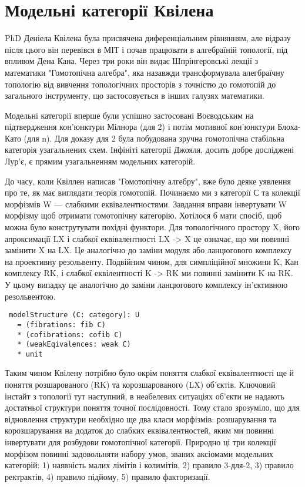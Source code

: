 \section{Модельні категорії Квілена}

PhD Деніела Квілена була присвячена диференціальним рівнянням,
але відразу після цього він перевівся в МІТ і почав працювати
в алгебраїній топології, під впливом Дена Кана. Через три роки
він видає Шпрінгеровські лекції з математики "Гомотопічна алгебра",
яка назавжди трансформувала алегбраїчну топологію від вивчення
топологічних просторів з точністю до гомотопій до загального
інструменту, що застосовується в інших галузях математики.

Модельні категорії вперше були успішно застосовані Воєводським
на підтвердження кон'юнктури Мілнора (для 2) і потім мотивної
кон'юнктури Блоха-Като (для n). Для доказу для 2 була побудована
зручна гомотопічна стабільна категорія узагальнених схем. Інфініті
категорії Джояля, досить добре досліджені Лур'є, є прямим
узагальненням модельних категорій.

До часу, коли Квіллен написав "Гомотопічну алгебру", вже було
деяке уявлення про те, як має виглядати теорія гомотопій.
Починаємо ми з категорії С та колекції морфізмів W --- слабкими
еквівалентностями. Завдання вправи інвертувати W морфізму щоб
отримати гомотопічну категорію. Хотілося б мати спосіб, щоб
можна було конструтувати похідні функтори. Для топологічного
простору X, його апроксимації LX і слабкої еквівалентності LX -> X це
означає, що ми повинні замінити X на LX. Це аналогічно до заміни
модуля або ланцюгового комплексу на проективну резольвенту.
Подвійним чином, для симпліційної множини K, Кан комплексу
RK, і слабкої еквілентності K -> RK ми повинні замінити K
на RK. У цьому випадку це аналогічно до заміни ланцюгового
комплексу ін'єктивною резольвентою.

\begin{lstlisting}
 modelStructure (C: category): U
   = (fibrations: fib C)
   * (cofibrations: cofib C)
   * (weakEqivalences: weak C)
   * unit
\end{lstlisting}

Таким чином Квілену потрібно було окрім поняття слабкої еквівалентності
ще й поняття розшарованого (RK) та корозшарованого (LX) об'єктів.
Ключовий інстайт з топології тут наступний, в неабелевих ситуаціях
об'єкти не надають достатньої структури поняття точної послідовності.
Тому стало зрозуміло, що для відновлення структури необхідно ще два
класи морфізмів: розшарування та корозшарування на додаток до слабких
еквівалентностей, яким ми повинні інвертувати для розбудови гомотопічної
категорії. Природно ці три колекції морфізом повинні задовольняти
набору умов, званих аксіомами модельних категорій: 1) наявність
малих лімітів і колимітів, 2) правило 3-для-2, 3) правило ректрактів,
4) правило підйому, 5) правило факторизації.


